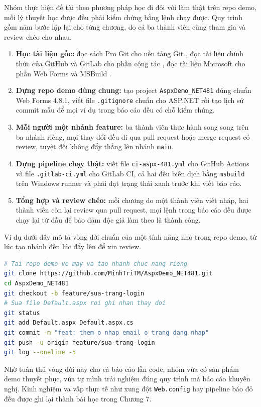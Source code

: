 Nhóm thực hiện đề tài theo phương pháp học đi đôi với làm thật trên repo demo, mỗi lý thuyết học được đều phải kiểm chứng bằng lệnh chạy được.
Quy trình gồm năm bước lặp lại cho từng chương, do cả ba thành viên cùng tham gia và review chéo cho nhau.
\begin{enumerate}
\item \textbf{Học tài liệu gốc:} đọc sách Pro Git cho nền tảng Git \cite{progit}, đọc tài liệu chính thức của GitHub và GitLab cho phần cộng tác \cite{githubdocs, gitlabdocs}, đọc tài liệu Microsoft cho phần Web Forms và MSBuild \cite{msnetfx, msmsbuild}.
\item \textbf{Dựng repo demo dùng chung:} tạo project \texttt{AspxDemo\_NET481} đúng chuẩn Web Forms 4.8.1, viết file \texttt{.gitignore} chuẩn cho ASP.NET rồi tạo lịch sử commit mẫu để mọi ví dụ trong báo cáo đều có chỗ kiểm chứng.
\item \textbf{Mỗi người một nhánh feature:} ba thành viên thực hành song song trên ba nhánh riêng, mọi thay đổi đều đi qua pull request hoặc merge request có review, tuyệt đối không đẩy thẳng lên nhánh \verb|main|.
\item \textbf{Dựng pipeline chạy thật:} viết file \texttt{ci-aspx-481.yml} cho GitHub Actions và file \texttt{.gitlab-ci.yml} cho GitLab CI, cả hai đều biên dịch bằng \verb|msbuild| trên Windows runner và phải đạt trạng thái xanh trước khi viết báo cáo.
\item \textbf{Tổng hợp và review chéo:} mỗi chương do một thành viên viết nháp, hai thành viên còn lại review qua pull request, mọi lệnh trong báo cáo đều được chạy lại từ đầu để bảo đảm độc giả làm theo là thành công.
\end{enumerate}
Ví dụ dưới đây mô tả vòng đời chuẩn của một tính năng nhỏ trong repo demo, từ lúc tạo nhánh đến lúc đẩy lên để xin review.
\begin{lstlisting}[language=bash]
# Tai repo demo ve may va tao nhanh chuc nang rieng
git clone https://github.com/MinhTriTM/AspxDemo_NET481.git
cd AspxDemo_NET481
git checkout -b feature/sua-trang-login
# Sua file Default.aspx roi ghi nhan thay doi
git status
git add Default.aspx Default.aspx.cs
git commit -m "feat: them o nhap email o trang dang nhap"
git push -u origin feature/sua-trang-login
git log --oneline -5
\end{lstlisting}
Nhờ tuân thủ vòng đời này cho cả báo cáo lẫn code, nhóm vừa có sản phẩm demo thuyết phục, vừa tự mình trải nghiệm đúng quy trình mà báo cáo khuyến nghị.
Kinh nghiệm va vấp thực tế như xung đột \texttt{Web.config} hay pipeline báo đỏ đều được ghi lại thành bài học trong Chương 7.

